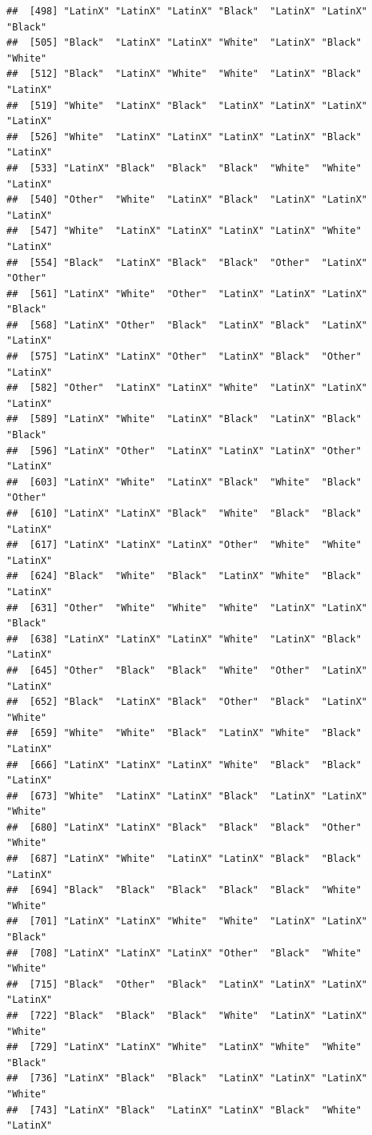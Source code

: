 \documentclass[]{book}
\begin{document}
\begin{verbatim}
##  [498] "LatinX" "LatinX" "LatinX" "Black"  "LatinX" "LatinX" "Black" 
##  [505] "Black"  "LatinX" "LatinX" "White"  "LatinX" "Black"  "White" 
##  [512] "Black"  "LatinX" "White"  "White"  "LatinX" "Black"  "LatinX"
##  [519] "White"  "LatinX" "Black"  "LatinX" "LatinX" "LatinX" "LatinX"
##  [526] "White"  "LatinX" "LatinX" "LatinX" "LatinX" "Black"  "LatinX"
##  [533] "LatinX" "Black"  "Black"  "Black"  "White"  "White"  "LatinX"
##  [540] "Other"  "White"  "LatinX" "Black"  "LatinX" "LatinX" "LatinX"
##  [547] "White"  "LatinX" "LatinX" "LatinX" "LatinX" "White"  "LatinX"
##  [554] "Black"  "LatinX" "Black"  "Black"  "Other"  "LatinX" "Other" 
##  [561] "LatinX" "White"  "Other"  "LatinX" "LatinX" "LatinX" "Black" 
##  [568] "LatinX" "Other"  "Black"  "LatinX" "Black"  "LatinX" "LatinX"
##  [575] "LatinX" "LatinX" "Other"  "LatinX" "Black"  "Other"  "LatinX"
##  [582] "Other"  "LatinX" "LatinX" "White"  "LatinX" "LatinX" "LatinX"
##  [589] "LatinX" "White"  "LatinX" "Black"  "LatinX" "Black"  "Black" 
##  [596] "LatinX" "Other"  "LatinX" "LatinX" "LatinX" "Other"  "LatinX"
##  [603] "LatinX" "White"  "LatinX" "Black"  "White"  "Black"  "Other" 
##  [610] "LatinX" "LatinX" "Black"  "White"  "Black"  "Black"  "LatinX"
##  [617] "LatinX" "LatinX" "LatinX" "Other"  "White"  "White"  "LatinX"
##  [624] "Black"  "White"  "Black"  "LatinX" "White"  "Black"  "LatinX"
##  [631] "Other"  "White"  "White"  "White"  "LatinX" "LatinX" "Black" 
##  [638] "LatinX" "LatinX" "LatinX" "White"  "LatinX" "Black"  "LatinX"
##  [645] "Other"  "Black"  "Black"  "White"  "Other"  "LatinX" "LatinX"
##  [652] "Black"  "LatinX" "Black"  "Other"  "Black"  "LatinX" "White" 
##  [659] "White"  "White"  "Black"  "LatinX" "White"  "Black"  "LatinX"
##  [666] "LatinX" "LatinX" "LatinX" "White"  "Black"  "Black"  "LatinX"
##  [673] "White"  "LatinX" "LatinX" "Black"  "LatinX" "LatinX" "White" 
##  [680] "LatinX" "LatinX" "Black"  "Black"  "Black"  "Other"  "White" 
##  [687] "LatinX" "White"  "LatinX" "LatinX" "Black"  "Black"  "LatinX"
##  [694] "Black"  "Black"  "Black"  "Black"  "Black"  "White"  "White" 
##  [701] "LatinX" "LatinX" "White"  "White"  "LatinX" "LatinX" "Black" 
##  [708] "LatinX" "LatinX" "LatinX" "Other"  "Black"  "White"  "White" 
##  [715] "Black"  "Other"  "Black"  "LatinX" "LatinX" "LatinX" "LatinX"
##  [722] "Black"  "Black"  "Black"  "White"  "LatinX" "LatinX" "White" 
##  [729] "LatinX" "LatinX" "White"  "LatinX" "White"  "White"  "Black" 
##  [736] "LatinX" "Black"  "Black"  "LatinX" "LatinX" "LatinX" "White" 
##  [743] "LatinX" "Black"  "LatinX" "LatinX" "Black"  "White"  "LatinX"

\end{verbatim}
\end{document}
